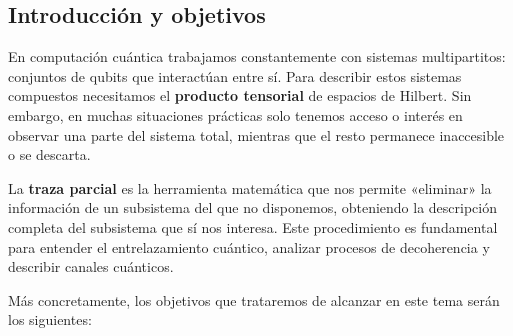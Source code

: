 \portada

\begin{esquemaExplorador}
\end{esquemaExplorador}


\subsection{Introducción y objetivos}

En computación cuántica trabajamos constantemente con sistemas multipartitos: conjuntos de qubits que interactúan entre sí. Para describir estos sistemas compuestos necesitamos el \textbf{producto tensorial} de espacios de Hilbert. Sin embargo, en muchas situaciones prácticas solo tenemos acceso o interés en observar una parte del sistema total, mientras que el resto permanece inaccesible o se descarta.

La \textbf{traza parcial} es la herramienta matemática que nos permite «eliminar» la información de un subsistema del que no disponemos, obteniendo la descripción completa del subsistema que sí nos interesa. Este procedimiento es fundamental para entender el entrelazamiento cuántico, analizar procesos de decoherencia y describir canales cuánticos.

Más concretamente, los objetivos que trataremos de alcanzar en este tema serán los siguientes:

